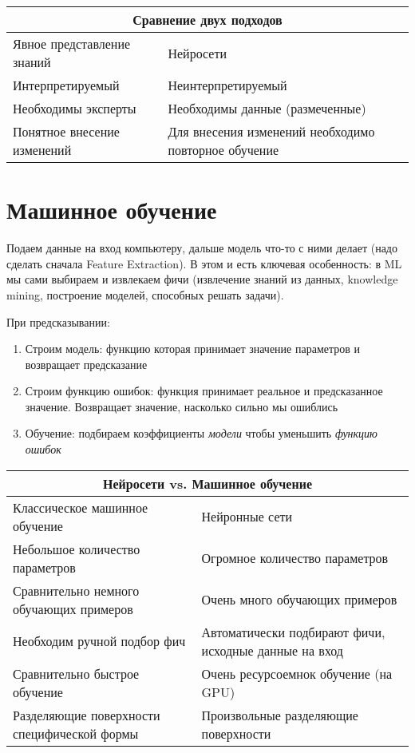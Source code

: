 \documentclass[12pt]{extarticle}
\begin{document}
\begin{center}
    \begin{tabularx}{\textwidth}{|l|X|}
        \multicolumn{2}{c}{Сравнение двух подходов}\\\hline
        Явное представление знаний & Нейросети \\\hline
        Интерпретируемый & Неинтерпретируемый \\\hline
        Необходимы эксперты & Необходимы данные (размеченные) \\\hline
        Понятное внесение изменений & Для внесения изменений необходимо
        повторное обучение \\\hline
    \end{tabularx}
\end{center}

\section{Машинное обучение}
\par Подаем данные на вход компьютеру, дальше модель что-то с ними делает (надо
сделать сначала Feature Extraction). В этом и есть ключевая особенность: в ML мы
сами выбираем и извлекаем фичи (извлечение знаний из данных, knowledge mining,
построение моделей, способных решать задачи).
\par При предсказывании:
\begin{enumerate}
    \item Строим модель: функцию которая принимает значение параметров и
        возвращает предсказание
    \item Строим функцию ошибок: функция принимает реальное и предсказанное
        значение. Возвращает значение, насколько сильно мы ошиблись
    \item Обучение: подбираем коэффициенты \textit{модели} чтобы уменьшить
        \textit{функцию ошибок}
\end{enumerate}

\begin{center}
    \begin{tabularx}{\textwidth}{|X|X|}
        \multicolumn{2}{c}{Нейросети vs. Машинное обучение}\\\hline
        Классическое машинное обучение & Нейронные сети \\\hline
        Небольшое количество параметров & Огромное количество параметров \\\hline
        Сравнительно немного обучающих примеров & Очень много обучающих
        примеров \\\hline
        Необходим ручной подбор фич & Автоматически подбирают фичи, исходные
        данные на вход \\\hline
        Сравнительно быстрое обучение & Очень ресурсоемнок обучение (на GPU) \\\hline
        Разделяющие поверхности специфической формы & Произвольные разделяющие
        поверхности \\\hline
    \end{tabularx}
\end{center}
\end{document}
